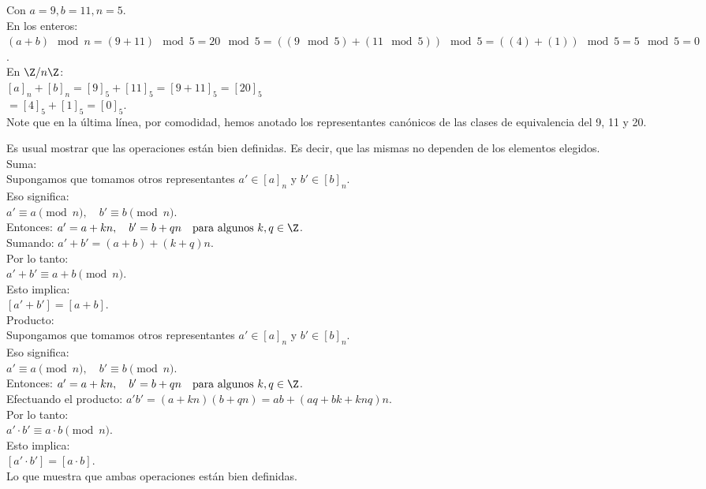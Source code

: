\begin{ejemplo}
Con $a=9, b=11, n=5$. \\
En los enteros: \\
$(a+b) \mod n = (9+11) \mod 5 = 20 \mod 5 = ( (9 \mod 5) + (11 \mod 5) ) \mod 5 = ( (4) + (1) ) \mod 5 = 5 \mod 5 = 0$. \\
En $\Z/n\Z$: \\
$[a]_n + [b]_n = [9]_5 + [11]_5 = [9 + 11]_5 = [20]_5$ \\
$= [4]_5 + [1]_5 = [0]_5$. \\
Note que en la última línea, por comodidad, hemos anotado los representantes canónicos de las clases de equivalencia del 9, 11 y 20.
\end{ejemplo}

Es usual mostrar que las operaciones están bien definidas. Es decir, que las mismas no dependen de los elementos elegidos.\\
Suma: \\
Supongamos que tomamos otros representantes $a' \in [a]_n$ y $b' \in [b]_n$. \\  
Eso significa: \\
$a' \equiv a \pmod{n}, \quad b' \equiv b \pmod{n}$. \\
Entonces:
$a' = a + kn, \quad b' = b + qn \quad \text{para algunos } k,q \in \Z$. \\
Sumando:
$a' + b' = (a+b) + (k+q)n$. \\

Por lo tanto: \\
$a' + b' \equiv a+b \pmod{n}$. \\
Esto implica: \\
$[a'+b'] = [a+b]$. \\
Producto: \\
Supongamos que tomamos otros representantes $a' \in [a]_n$ y $b' \in [b]_n$. \\  
Eso significa: \\
$a' \equiv a \pmod{n}, \quad b' \equiv b \pmod{n}$. \\
Entonces:
$a' = a + kn, \quad b' = b + qn \quad \text{para algunos } k,q \in \Z$. \\
Efectuando el producto:
$a'b' = (a+kn)(b+q n) = ab + (aq + bk + knq)n$. \\
Por lo tanto: \\
$a' \cdot b' \equiv a \cdot b \pmod{n}$. \\
Esto implica: \\
$[a'\cdot b'] = [a \cdot b]$. \\
Lo que muestra que ambas operaciones están bien definidas.\\

